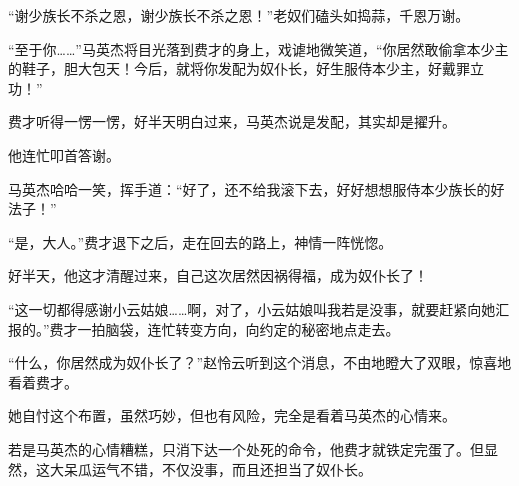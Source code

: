 \begin{this_body}
“谢少族长不杀之恩，谢少族长不杀之恩！”老奴们磕头如捣蒜，千恩万谢。

“至于你……”马英杰将目光落到费才的身上，戏谑地微笑道，“你居然敢偷拿本少主的鞋子，胆大包天！今后，就将你发配为奴仆长，好生服侍本少主，好戴罪立功！”

费才听得一愣一愣，好半天明白过来，马英杰说是发配，其实却是擢升。

他连忙叩首答谢。

马英杰哈哈一笑，挥手道：“好了，还不给我滚下去，好好想想服侍本少族长的好法子！”

“是，大人。”费才退下之后，走在回去的路上，神情一阵恍惚。

好半天，他这才清醒过来，自己这次居然因祸得福，成为奴仆长了！

“这一切都得感谢小云姑娘……啊，对了，小云姑娘叫我若是没事，就要赶紧向她汇报的。”费才一拍脑袋，连忙转变方向，向约定的秘密地点走去。

“什么，你居然成为奴仆长了？”赵怜云听到这个消息，不由地瞪大了双眼，惊喜地看着费才。

她自忖这个布置，虽然巧妙，但也有风险，完全是看着马英杰的心情来。

若是马英杰的心情糟糕，只消下达一个处死的命令，他费才就铁定完蛋了。但显然，这大呆瓜运气不错，不仅没事，而且还担当了奴仆长。

\end{this_body}

